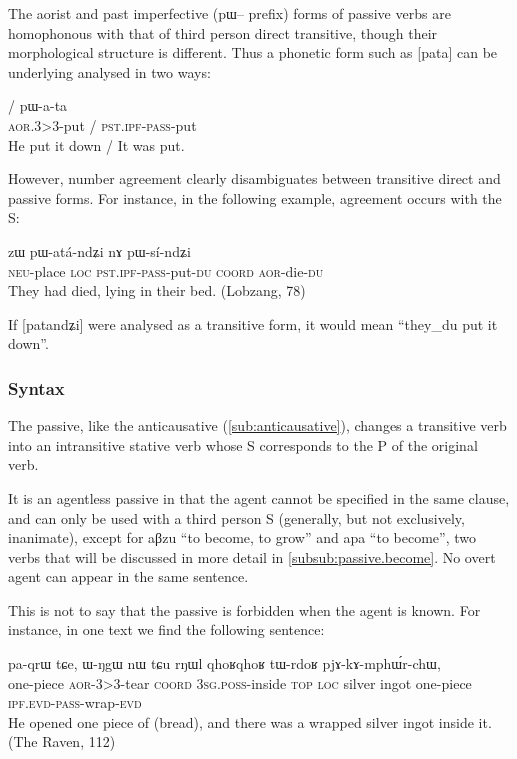 \documentclass[oldfontcommands,oneside,a4paper,11pt]{memoir}
\newcommand{\ipa}[1]{{\phon #1}} %
\newcommand{\aor}{\textsc{aor}}
\newcommand{\coord}{\textsc{coord}}
\newcommand{\du}{\textsc{du}}
\newcommand{\evd}{\textsc{evd}}
\newcommand{\ipf}{\textsc{ipf}}
\newcommand{\loc}{\textsc{loc}}
\newcommand{\neu}{\textsc{neu}}
\newcommand{\pass}{\textsc{pass}}
\newcommand{\poss}{\textsc{poss}}
\newcommand{\pst}{\textsc{pst}}
\newcommand{\sg}{\textsc{sg}}
\newcommand{\topic}{\textsc{top}}
\begin{document}
The aorist and past imperfective (\ipa{pɯ}-- prefix) forms of passive verbs are homophonous with that of third person direct transitive, though their morphological structure is different. Thus a phonetic form such as [pata] can be underlying analysed in two ways:
\begin{exe}
\ex
\gll   \ipa{pa-ta}  /  \ipa{pɯ-a-ta}\\
 \aor{}.3>3-put / \pst{}.\ipf{}-\pass{}-put \\
 \glt   He put it down / It was put.
\end{exe} 

However, number agreement clearly disambiguates between transitive direct and passive forms. For instance, in the following example, agreement  occurs with the S:

 
\begin{exe}
\ex
\gll  \ipa{tɤ-sta} 	\ipa{zɯ} 	\ipa{pɯ-atá-ndʑi} 	\ipa{nɤ} 	\ipa{pɯ-sí-ndʑi}  \\
\neu{}-place \loc{}  \pst{}.\ipf{}-\pass{}-put-\du{} \coord{} \aor{}-die-\du{} \\
 \glt    They had died, lying in their bed. (Lobzang, 78)
\end{exe} 

If [patandʑi] were analysed as a transitive form, it would mean ``they_{du} put it down''. 

%
%
%



 

\subsubsection{Syntax}  \label{subsub:passive.syntax}

The passive, like the anticausative (\ref{sub:anticausative}), changes a transitive verb into an intransitive stative verb whose S corresponds to the P of the original verb.
 
It is an agentless passive in that the agent cannot be specified in the same clause, and can only be used with a third person  S (generally, but not exclusively, inanimate), except for \ipa{aβzu} ``to become, to grow'' and \ipa{apa} ``to become'', two verbs that will be discussed in more detail in \ref{subsub:passive.become}. No overt agent can appear in the same sentence. 

This is not to say that the passive is forbidden when the agent is known. For instance, in one text we find the following sentence:
\begin{exe}
\ex
\gll     \ipa{tɯ-rdoʁ} 	\ipa{pa-qrɯ} 	\ipa{tɕe,} 	\ipa{ɯ-ŋgɯ} 	\ipa{nɯ} 	\ipa{tɕu} \ipa{rŋɯl} 	\ipa{qhoʁqhoʁ} 	\ipa{tɯ-rdoʁ} 	\ipa{pjɤ-kɤ-mphɯ́r-chɯ,} 
  \\
 one-piece	\aor{}-3>3-tear	\coord{}	3\sg{}.\poss{}-inside	\topic{}  \loc{} silver	ingot		one-piece	\ipf{}.\evd{}-\pass{}-wrap-\evd{} \\
 \glt   He opened one piece of (bread), and there was a wrapped silver ingot inside it.  (The Raven, 112)
\end{exe} 
\end{document}

